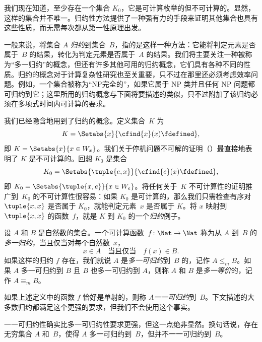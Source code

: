 \documentclass[../../../include/open-logic-section]{subfiles}
\begin{document}

\begin{explain}
我们现在知道，至少存在一个集合 $K_0$，它是可计算枚举的但不可计算的。显然，这样的集合并不唯一。归约性方法提供了一种强有力的手段来证明其他集合也具有这些性质，而无需每次都从第一性原理出发。

一般来说，将集合 $A$ \emph{归约}到集合~$B$，指的是这样一种方法：它能将判定元素是否属于~$B$ 的结果，转化为判定元素是否属于~$A$ 的结果。我们将主要关注一种被称为“多一归约”的概念，但还有许多其他可用的归约概念，它们具有各种不同的性质。归约的概念对于计算复杂性研究也至关重要，只不过在那里还必须考虑效率问题。例如，一个集合被称为“NP完全的”，如果它属于 NP 类并且任何 NP 问题都可归约到它；这里所用的归约概念与下面将要描述的类似，只不过附加了该归约必须在多项式时间内可计算的要求。

我们已经隐含地用到了归约的概念。定义集合~$K$ 为
\[
K = \Setabs{x}{\cfind{x}(x) \fdefined},
\]
即 $K = \Setabs{x}{x \in W_x}$。我们关于停机问题不可解的证明（）最直接地表明了 $K$ 是不可计算的。回想 $K_0$ 是集合
\[
K_0 = \Setabs{\tuple{e, x}}{\cfind{e}(x) \fdefined },
\]
即 $K_0 = \Setabs{\tuple{x,e}}{x \in W_e}$。将任何关于~$K$ 不可计算性的证明推广到~$K_0$ 的不可计算性很容易：如果 $K_0$ 是可计算的，那么我们只需检查有序对 $\tuple{x, x}$ 是否属于 $K_0$，就能判定元素~$x$ 是否属于 $K$。将 $x$ 映射到 $\tuple{x, x}$ 的函数~$f$，就是 $K$ 到 $K_0$ 的一个\emph{归约}例子。
\end{explain}

\begin{defn}
设 $A$ 和 $B$ 是自然数的集合。一个可计算函数~$f\colon \Nat \to \Nat$ 称为从 $A$ 到~$B$ 的\emph{多一归约}，当且仅当对每个自然数~$x$，
\[
x \in A \quad \text{当且仅当} \quad f(x) \in B.
\]
如果这样的归约 $f$ 存在，我们就说 $A$ 是\emph{多一可归约}到~$B$ 的，记作 $A \leq_m B$。如果 $A$ 多一可归约到 $B$ 且 $B$ 也多一可归约到 $A$，则称 $A$ 和 $B$ 是\emph{多一等价}的，记作 $A \equiv_m B$。
\end{defn}

如果上述定义中的函数 $f$ 恰好是单射的，则称 $A$\emph{一一可归约}到~$B$。下文描述的大多数归约都满足这个更强的要求，但我们不会使用这个事实。

\begin{digress}
一一可归约性确实比多一可归约性要求更强，但这一点绝非显然。换句话说，存在无穷集合 $A$ 和~$B$，使得 $A$ 多一可归约到~$B$，但并不一一可归约到~$B$。
\end{digress}
\end{document}
